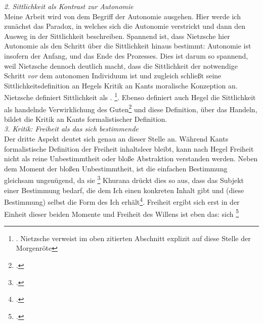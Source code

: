 \documentclass[12pt, a4paper, openany]{report}
\begin{document}
\emph{2. Sittlichkeit als Kontrast zur Autonomie}\\
Meine Arbeit wird von dem Begriff der Autonomie ausgehen. 
Hier werde ich zunächst das Paradox, in welches sich die Autonomie verstrickt und dann den Ausweg in der Sittlichkeit beschreiben.
Spannend ist, dass Nietzsche hier Autonomie als den Schritt über die Sittlichkeit hinaus bestimmt:
Autonomie ist insofern der Anfang, und das Ende des Prozesses.
Dies ist darum so spannend, weil Nietzsche dennoch deutlich macht, dass die Sittlichkeit der notwendige Schritt \emph{vor} dem autonomen Individuum ist und zugleich schließt seine Sittlichkeitsdefinition an Hegels Kritik an Kants moralische Konzeption an.
Nietzsche definiert Sittlichkeit als .%
\footnote{%
    . 
    Nietzsche verweist im oben zitierten Abschnitt explizit auf diese Stelle der Morgenröte
    }.
Ebenso definiert auch Hegel die Sittlichkeit als handelnde Verwirklichung des Guten\footcite[Vgl.][§142, S. 161]{hegel_grundlinien_2017} und diese Definition, über das Handeln, bildet die Kritik an Kants formalistischer Definition.\\

\emph{3. Kritik: Freiheit als das sich bestimmende}\\
Der dritte Aspekt deutet sich genau an dieser Stelle an. 
Während Kants formalistische Definition der Freiheit inhaltsleer bleibt, kann nach Hegel Freiheit nicht als reine Unbestimmtheit oder bloße Abstraktion verstanden werden.
Neben dem Moment der bloßen Unbestimmtheit, ist die einfachen Bestimmung gleichsam ungenügend, da sie \footcite[][39]{hegel_grundlinien_2017}
Khurana drückt dies so aus, dass das Subjekt einer Bestimmung bedarf, die dem Ich einen konkreten Inhalt gibt und (diese Bestimmung) selbst die Form des Ich erhält\footcite[Vgl.][285]{khurana_freiheit_2017}. 
Freiheit ergibt sich erst in der Einheit dieser beiden Momente und Freiheit des Willens ist eben das: sich \footcite[][40, §7]{hegel_grundlinien_2017}\\
\end{document}
